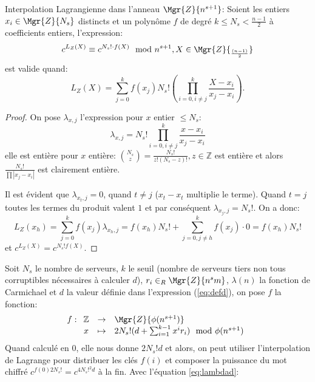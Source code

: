 	\begin{theorem} Interpolation Lagrangienne dans l'anneau $\Mgr{Z}{n^{s+1}}$: Soient les entiers   $x_i \in \Mgr{Z}{N_s}$ distincts et un polynôme $f$ de degré $k\leq N_s<\frac{n-1}{2}$ à coefficients entiers, l'expression:
	$$ c^{L_Z(X)} \equiv c^{N_s!\cdot f(X)}\mod{n^{s+1}}, X\in\Mgr{Z}{_\frac{(n-1)}{2}} $$
	est valide quand: $$L_Z(X) = \sum_{j=0}^{k}f(x_j)N_s!\left(\prod_{i=0,i\neq j}^{k} \frac{X-x_i}{x_j-x_i}\right).$$ 
	\begin{proof}
	On pose $\lambda_{x,j}$ l'expression pour $x$ entier $\leq N_s$:
		$$\lambda_{x,j} = N_s!\prod_{i=0,i\neq j}^{k} \frac{x-x_i}{x_j-x_i}$$
		elle est entière pour $x$ entière: $\binom{N_s}{z} = \frac{N_s!}{z!(N_s-z)!},z\in\mathbb{Z}$ est entière et alors $\frac{N_s!}{\prod|x_j-x_i|}$ est clairement
		entière.
		
		Il est évident que $\lambda_{x_t,j} = 0$, quand $t\neq j$ ($x_t-x_t$ multiplie le terme). Quand $t=j$ toutes les termes du produit valent $1$ et 
		par conséquent $\lambda_{x_j,j} = N_s!$. On a donc:
		$$  L_Z(x_h) = \sum_{j=0}^{k}f(x_j)\lambda_{x_h,j} = f(x_h) N_s! + \sum_{j=0,j\neq h}^{k}f(x_j)\cdot 0 = f(x_h)N_s! $$
		et $c^{L_Z(X)} = c^{N_s!f(X)}$.
	\end{proof}
	\end{theorem}


	Soit $N_s$ le nombre de serveurs, $k$ le seuil (nombre de serveurs tiers non tous corruptibles nécessaires à calculer $d$), 
	$r_i\in_R\Mgr{Z}{n^sm}$, 
	$\lambda(n)$ la fonction de Carmichael et $d$ la valeur définie dans l'expression (\ref{eq:defd}), on pose $f$ la fonction:
			\begin{equation}
				f : \begin{array}[t]{ccl} \mathbb{Z} &\rightarrow &   \Mgr{Z}{\phi(n^{s+1})}  \\
					x  &\mapsto& 2N_s!(d + \sum_{i = 1}^{k-1} x^ir_i) \mod{\phi(n^{s+1})} 
				\end{array}
			\end{equation}
	Quand calculé en $0$, elle nous donne $2N_s!d$ et alors, on peut utiliser l'interpolation de Lagrange pour 
	distribuer les clés $f(i)$ et composer la puissance du mot chiffré $c^{f(0)2N_s!} =  c^{4N_s!^2d}$ à la fin. 
	Avec l'équation \ref{eq:lambdad}:
		
